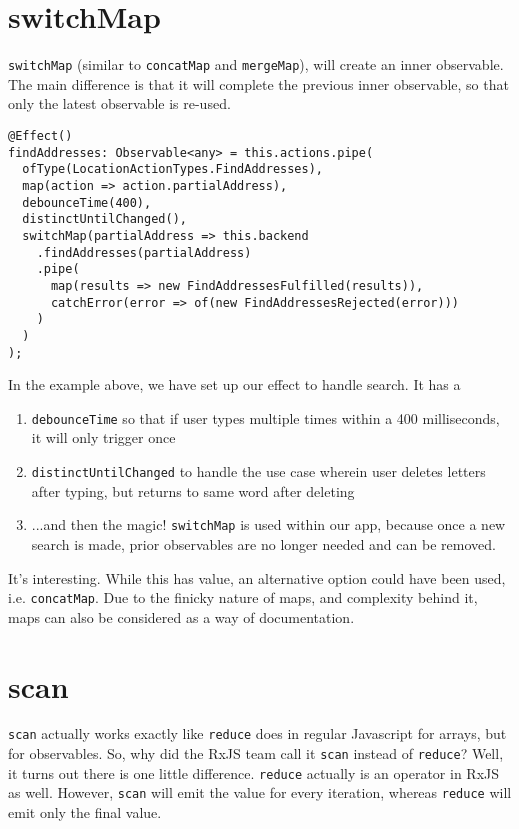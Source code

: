 \section{switchMap}
\lstinline{switchMap} (similar to \lstinline{concatMap} and \lstinline{mergeMap}),
will create an inner observable. The main difference is that it will complete 
the previous inner observable, so that only the latest observable is re-used. 

\begin{lstlisting}[caption=search-bar.component.ts]
@Effect()
findAddresses: Observable<any> = this.actions.pipe(
  ofType(LocationActionTypes.FindAddresses),
  map(action => action.partialAddress),
  debounceTime(400),
  distinctUntilChanged(),
  switchMap(partialAddress => this.backend
    .findAddresses(partialAddress)
    .pipe(
      map(results => new FindAddressesFulfilled(results)),
      catchError(error => of(new FindAddressesRejected(error)))
    )
  )
);  
\end{lstlisting}
 
In the example above, we have set up our effect to handle search. It has a 
\begin{enumerate}
  \item \lstinline{debounceTime} so that if user types multiple times within
  a 400 milliseconds, it will only trigger once
  \item \lstinline{distinctUntilChanged} to handle the use case wherein user 
  deletes letters after typing, but returns to same word after deleting
  \item ...and then the magic! \lstinline{switchMap} is used within our app,
  because once a new search is made, prior observables are no longer needed 
  and can be removed. 
\end{enumerate}

It's interesting. While this has value, an alternative option could have been 
used, i.e. \lstinline{concatMap}. Due to the finicky nature of maps, and 
complexity behind it, maps can also be considered as a way of documentation.


\section{scan}
\lstinline{scan} actually works exactly like \lstinline{reduce} does in 
regular Javascript for arrays, but for observables. So, why did the RxJS team 
call it \lstinline{scan} instead of \lstinline{reduce}? Well, it turns out there 
is one little difference. \lstinline{reduce} actually is an operator in RxJS as
well. However, \lstinline{scan} will emit the value for every iteration, whereas 
\lstinline{reduce} will emit only the final value. 

